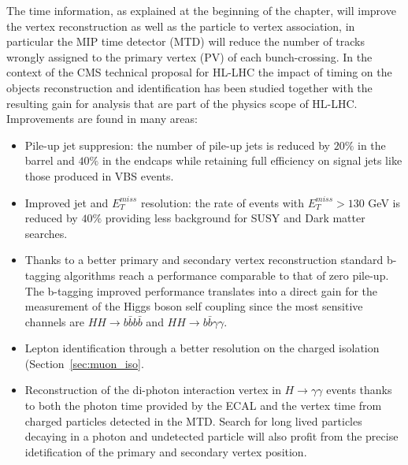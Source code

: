The time information, as explained at the beginning of the chapter, will improve the vertex reconstruction as
well as the particle to vertex association, in particular the MIP time detector (MTD) will reduce the
number of tracks wrongly assigned to the primary vertex (PV) of each bunch-crossing.
In the context of the CMS technical proposal for HL-LHC the impact of timing on the objects reconstruction and
identification has been studied together with the resulting gain for analysis that are part of the physics scope
of HL-LHC.
Improvements are found in many areas:
\begin{itemize}
\item Pile-up jet suppresion: the number of pile-up jets is reduced by $20\%$ in the barrel and $40\%$ in the endcaps
  while retaining full efficiency on signal jets like those produced in VBS events.
\item Improved jet and $E_T^{miss}$ resolution: the rate of events with $E_T^{miss}>130$ GeV is reduced by
  $40\%$ providing less background for SUSY and Dark matter searches.
\item Thanks to a better primary and secondary vertex reconstruction standard b-tagging algorithms reach
  a performance comparable to that of zero pile-up. The b-tagging improved performance translates into
  a direct gain for the measurement of the Higgs boson self coupling since the most sensitive channels
  are $HH\to b\bar{b}b\bar{b}$ and $HH \to b\bar{b}\gamma\gamma$. 
\item Lepton identification through a better resolution on the charged isolation (Section~\ref{sec:muon_iso}.
\item Reconstruction of the di-photon interaction vertex in $H\to\gamma\gamma$ events thanks to both the photon time
  provided by the ECAL and the vertex time from charged particles detected in the MTD. Search for long lived particles
  decaying in a photon and undetected particle will also profit from the precise idetification of the primary and
  secondary vertex position. 
\end{itemize}



